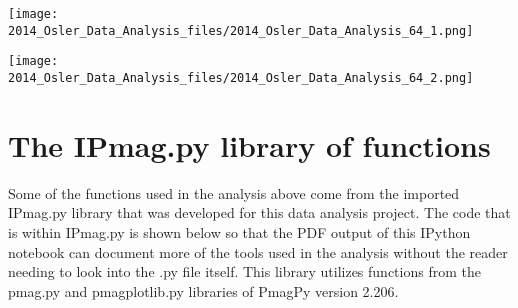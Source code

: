 \documentclass[letterpaper,10pt,english]{/Users/polarwander/Library/Enthought/Canopy_64bit/User/lib/python2.7/site-packages/sphinx/texinputs/sphinxhowto}
\newenvironment{InvisibleVerbatim}
        {\begin{mdframed}[leftmargin=0.1\linewidth,innerleftmargin=3pt,innerrightmargin=3pt, userdefinedwidth=1\linewidth, linewidth=0pt, linecolor=white, usetwoside=false]}
        {\end{mdframed}}
\begin{document}
                \begin{InvisibleVerbatim}
                \vspace{-0.5\baselineskip}
    \begin{center}
    \texttt{[image: 2014\_Osler\_Data\_Analysis\_files/2014\_Osler\_Data\_Analysis\_64\_1.png]}
    \par
    \end{center}
    
            \end{InvisibleVerbatim}
            
                \begin{InvisibleVerbatim}
                \vspace{-0.5\baselineskip}
    \begin{center}
    \texttt{[image: 2014\_Osler\_Data\_Analysis\_files/2014\_Osler\_Data\_Analysis\_64\_2.png]}
    \par
    \end{center}
    
            \end{InvisibleVerbatim}
            
        
    
\section{The IPmag.py library of functions}Some of the functions used in the analysis above come from the imported
IPmag.py library that was developed for this data analysis project. The
code that is within IPmag.py is shown below so that the PDF output of
this IPython notebook can document more of the tools used in the
analysis without the reader needing to look into the .py file itself.
This library utilizes functions from the pmag.py and pmagplotlib.py
libraries of PmagPy version 2.206.

\end{document}
